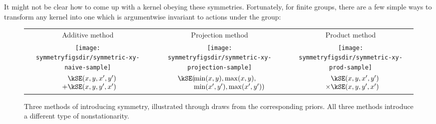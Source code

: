 It might not be clear how to come up with a kernel obeying these symmetries.  Fortunately, for finite groups, there are a few simple ways to transform any kernel into one which is argumentwise invariant to actions under the group:
%
%
\begin{figure}
\renewcommand{\tabcolsep}{1.5mm}
\begin{tabular}{ccc}
Additive method & Projection method & Product method \\[0.5ex]
\texttt{[image: \\symmetryfigsdir/symmetric-xy-naive-sample]} &
\texttt{[image: \\symmetryfigsdir/symmetric-xy-projection-sample]} &
\texttt{[image: \\symmetryfigsdir/symmetric-xy-prod-sample]}\\
$\begin{array}{r@{}l@{}}
& \kSE(x, y, x', y') \\ + & \kSE(x, y, y', x')
\end{array}$
&
$\begin{array}{r@{}l@{}}
\kSE( \!\! &{}\min(x, y), \max(x,y), \\
           &{}\min(x', y'), \max(x',y') )
\end{array}$
&
$\begin{array}{r@{}l@{}}
& \kSE(x, y, x', y') \\ \times & \kSE(x, y, y', x') 
\end{array}$
\end{tabular}
\caption[Three ways to introduce symmetry]{Three methods of introducing symmetry, illustrated through draws from the corresponding priors.
All three methods introduce a different type of nonstationarity.
}
\label{fig:add_vs_min}
\end{figure}
%
